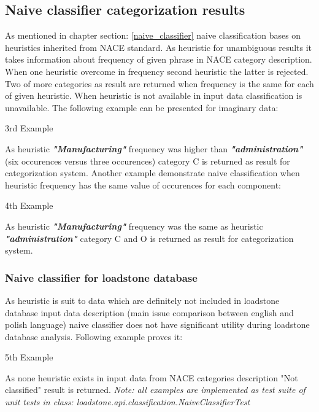 \subsection{Naive classifier categorization results}
As mentioned in chapter section: \ref{naive_classifier} naive classification bases on heuristics inherited from NACE standard. As heuristic for unambiguous results it takes information about frequency of given phrase in NACE category description. When one heuristic overcome in frequency second heuristic the latter is rejected. Two of more categories as result are returned when frequency is the same for each of given heuristic. When heuristic is not available in input data classification is unavailable. The following example can be presented for imaginary data:
\begin{algorithm}
\caption{3rd Example}\label{alg:3rd}
\end{algorithm}
As heuristic \textbf{\textit{"Manufacturing"}} frequency was higher than \textbf{\textit{"administration"}} (six occurences versus three occurences) category C is returned as result for categorization system.
\newline
Another example demonstrate naive classification when heuristic frequency has the same value of occurences for each component:
\begin{algorithm}
\caption{4th Example}\label{alg:4th}
\end{algorithm}  
As heuristic \textbf{\textit{"Manufacturing"}} frequency was the same as heuristic \textbf{\textit{"administration"}} category C and O is returned as result for categorization system.

\subsubsection{Naive classifier for loadstone database}

As heuristic is suit to data which are definitely not included in loadstone database input data description (main issue comparison between english and polish language) naive classifier does not have significant utility during loadstone database analysis. Following example proves it:
\newline
\begin{algorithm}
	\caption{5th Example}\label{alg:5th}
\end{algorithm}  
As none heuristic exists in input data from NACE categories description "Not classified" result is returned.
\newline
\textit{Note: all examples are implemented as test suite of unit tests in class: loadstone.api.classification.NaiveClassifierTest}    
